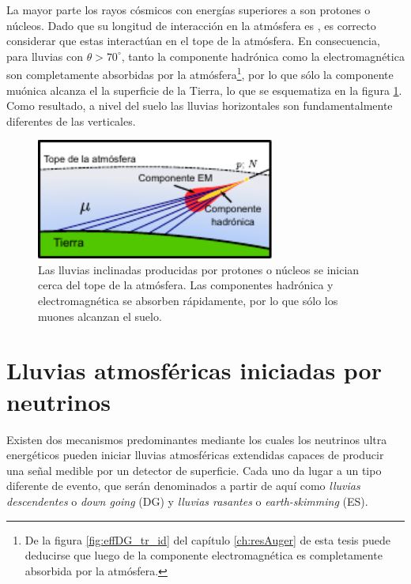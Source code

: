 La mayor parte los rayos cósmicos con energías superiores a  son protones o n\'ucleos.
Dado que su longitud de interacción en la atmósfera es , es correcto considerar que estas interact\'uan en el tope de la atmósfera.
En consecuencia, para lluvias con $\theta>70^\circ$, tanto la componente hadrónica como la electromagnética son completamente absorbidas por la atmósfera\footnote{De la figura \ref{fig:effDG_tr_id} del cap\'itulo \ref{ch:resAuger} de esta tesis puede deducirse que luego de  la componente electromagn\'etica es completamente absorbida por la atm\'osfera.}, por lo que sólo la componente muónica alcanza el la superficie de la Tierra, lo que se esquematiza en la figura \ref{fig:horizontalHad}.
Como resultado, a nivel del suelo las lluvias horizontales son fundamentalmente diferentes de las verticales.
%
\begin{figure}[h!]
\begin{center}
\includegraphics[width=0.7\textwidth]{fig/EASAuger/horizontal2_english.pdf}
\caption{Las lluvias inclinadas producidas por protones o n\'ucleos se inician cerca del tope de la atmósfera.
Las componentes hadrónica y electromagnética se absorben rápidamente, por lo que sólo los muones alcanzan el suelo.
}
\label{fig:horizontalHad}
\end{center}
\end{figure}

\section{Lluvias atmosf\'ericas iniciadas por neutrinos}
\label{sc:easNu}

Existen dos mecanismos predominantes mediante los cuales los neutrinos ultra energ\'eticos pueden iniciar lluvias atmosféricas extendidas capaces de producir una se\~nal medible por un detector de superficie.
Cada uno da lugar a un tipo diferente de evento, que ser\'an denominados a partir de aqu\'i como \emph{lluvias descendentes} o \emph{down going} (DG) y \emph{lluvias rasantes} o \emph{earth-skimming} (ES).

